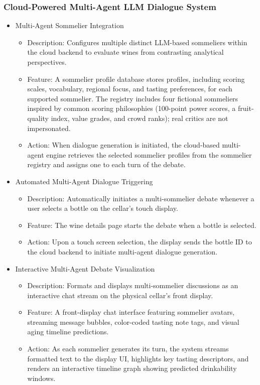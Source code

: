 \documentclass[conference]{IEEEtran}
\begin{document}
\subsubsection{Cloud-Powered Multi-Agent LLM Dialogue System}
\begin{itemize}
    \item Multi-Agent Sommelier Integration
    \begin{itemize}
        \item Description: Configures multiple distinct LLM-based sommeliers within the cloud backend to evaluate wines from contrasting analytical perspectives.
        \item Feature: A sommelier profile database stores profiles, including scoring scales, vocabulary, regional focus, and tasting preferences, for each supported sommelier. The registry includes four fictional sommeliers inspired by common scoring philosophies (100-point power scores, a fruit-quality index, value grades, and crowd ranks); real critics are not impersonated.
        \item Action: When dialogue generation is initiated, the cloud-based multi-agent engine retrieves the selected sommelier profiles from the sommelier registry and assigns one to each turn of the debate.
    \end{itemize}

    \item Automated Multi-Agent Dialogue Triggering
    \begin{itemize}
        \item Description: Automatically initiates a multi-sommelier debate whenever a user selects a bottle on the cellar's touch display.
        \item Feature: The wine details page starts the debate when a bottle is selected.
        \item Action: Upon a touch screen selection, the display sends the bottle ID to the cloud backend to initiate multi-agent dialogue generation.
    \end{itemize}

    \item Interactive Multi-Agent Debate Visualization
    \begin{itemize}
        \item Description: Formats and displays multi-sommelier discussions as an interactive chat stream on the physical cellar's front display.
        \item Feature: A front-display chat interface featuring sommelier avatars, streaming message bubbles, color-coded tasting note tags, and visual aging timeline predictions.
        \item Action: As each sommelier generates its turn, the system streams formatted text to the display UI, highlights key tasting descriptors, and renders an interactive timeline graph showing predicted drinkability windows.
    \end{itemize}


\end{itemize}
\end{document}
